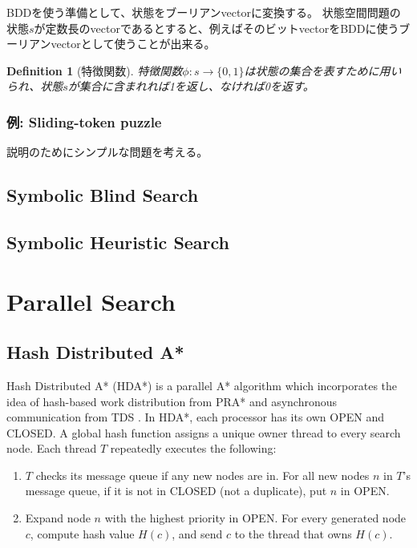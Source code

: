 \documentclass{book}
\newtheorem{definition}{Definition}
\begin{document}
BDDを使う準備として、状態をブーリアンvectorに変換する。
状態空間問題の状態$s$が定数長のvectorであるとすると、例えばそのビットvectorをBDDに使うブーリアンvectorとして使うことが出来る。

\begin{definition}[特徴関数]
特徴関数$\phi: s \rightarrow \{0, 1\}$は状態の集合を表すために用いられ、状態$s$が集合に含まれれば1を返し、なければ0を返す。
\end{definition}


\subsubsection{例: Sliding-token puzzle}

説明のためにシンプルな問題を考える。

\begin{figure}
\end{figure}


\subsection{Symbolic Blind Search}


\subsection{Symbolic Heuristic Search}


\section{Parallel Search}

\subsection{Hash Distributed A*}

Hash Distributed A* (HDA*) \cite{kishimotofb13} is a parallel A* algorithm 
which incorporates the idea of hash-based work distribution from  PRA* \cite{evett1995massively} and asynchronous communication from TDS \cite{romein1999transposition}.
In HDA*, 
each processor has its own OPEN and CLOSED.
A global hash function assigns a unique owner thread to every search node.
Each thread $T$ repeatedly executes the following: 
\begin{enumerate}
	\item 
           $T$ checks its message queue if any new nodes are in. For all new nodes $n$ in $T$'s message queue, if it is not in CLOSED (not a duplicate), put $n$ in OPEN. %
	\item 
           Expand node $n$ with the highest priority in OPEN. For every generated node $c$, compute hash value $H(c)$, and send $c$ to the thread that owns $H(c)$. %
\end{enumerate}
\end{document}

